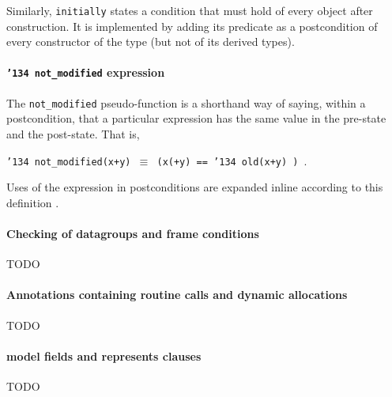 \documentclass{sig-alternate}
\begin{document}
Similarly, \texttt{initially} states a condition that must hold of every object after construction.  It is implemented by adding its predicate as a postcondition of every constructor of the type (but not 
of its derived types).

\paragraph*{\texttt{\char'134 not\_modified} expression}
The \texttt{not\_modified} pseudo-function is a shorthand way of saying, within a postcondition, that a particular 
expression has the same value in the pre-state and the post-state.  That is,
\begin{center}
\texttt{\char'134 not\_modified(x+y) $\equiv$ (x(+y) == \char'134 old(x+y) )  }.
\end{center}
Uses of the expression in postconditions are expanded inline according to this definition .

\paragraph*{Checking of datagroups and frame conditions}
TODO

\paragraph*{Annotations containing routine calls and dynamic allocations}
TODO

\paragraph*{model fields and represents clauses}
TODO
\end{document}
